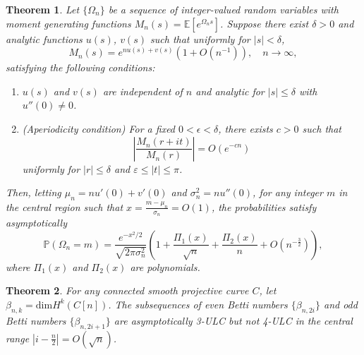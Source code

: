 \documentclass[10pt,a4paper]{amsart}
\newtheorem{theorem}{Theorem}
\def\EE{\mathbb{E}}
\newcommand{\PP}{\mathbb{P}}
\def\beq{\begin{equation}}
\def\dim{\mathrm{dim} }
\def\eeq{\end{equation}}
\begin{document}
\begin{theorem}\cite[Theorem 1]{HwangLLT}\label{LLT}
  Let $\{\Omega_n\}$ be a sequence of integer-valued random variables with moment generating functions $M_n(s)=\EE[e^{\Omega_n s}]$. Suppose there exist $\delta>0$ and analytic functions $u(s)$, $v(s)$ such that uniformly for $|s|<\delta$,
  \beq\label{eq:mgf} M_n(s) = e^{n u(s) +v(s)}\left(1+ O(n^{-1}) \right), \quad n\to \infty, \eeq
  satisfying the following conditions:
  \begin{enumerate}
    \item $u(s)$ and $v(s)$ are independent of $n$ and analytic for $|s|\le \delta$ with $u''(0)\ne 0$.
    \item \emph{(Aperiodicity condition)} For a fixed $0<\epsilon<\delta$, there exists $c>0$ such that
    \[ \left| \frac{M_n(r+it)}{M_n(r)}\right|=O(e^{-cn})\]
    uniformly for $|r|\le \delta$ and $\varepsilon \le |t|\le \pi$.
  \end{enumerate}
  Then, letting $\mu_n = n u'(0) +v'(0) $ and $\sigma_n^2 = n u''(0)$, for any integer $m$ in the central region such that $x =\frac{m-\mu_n}{\sigma_n}=O(1)$, the probabilities satisfy asymptotically
  \[ \PP(\Omega_n =m) = \frac{e^{-x^2/2}}{\sqrt{2 \pi \sigma_n^2}}\left( 1 + \frac{\Pi_1(x) }{\sqrt{n}} + \frac{\Pi_2(x) }{n}+ O\left( n^{-\frac{3}{2}}\right) \right),\]
  where $\Pi_1(x) $ and $\Pi_2(x) $ are polynomials.
\end{theorem}

\begin{theorem}\label{2_1}
 For any connected smooth projective curve $C$, let $\beta_{n,k}= \dim H^k(C[n])$.
 The subsequences of even Betti numbers $\{\beta_{n,2i}\}$ and odd Betti numbers $\{\beta_{n,2i+1}\}$ are asymptotically 3-ULC but not 4-ULC in the central range $|i - \frac{n}{2}|=O(\sqrt{n})$.
\end{theorem}
\end{document}
